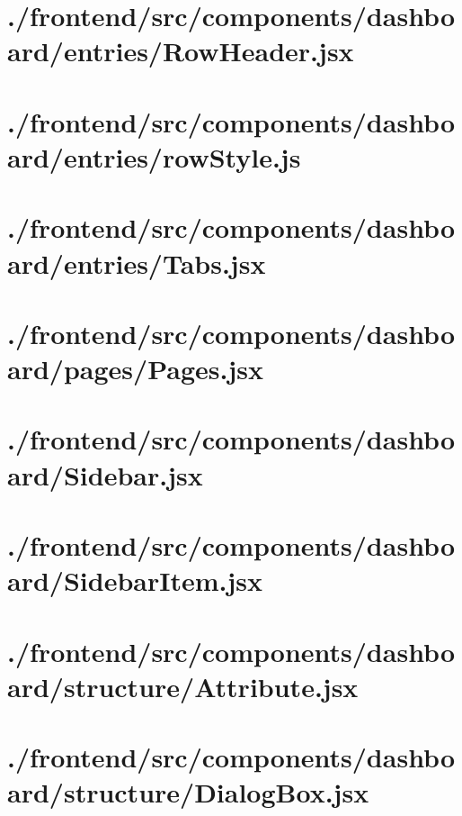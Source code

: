 \documentclass[11pt]{informatics-report}
\begin{document}
\newpage
\section{./frontend/src/components/dashboard/entries/RowHeader.jsx}


\newpage
\section{./frontend/src/components/dashboard/entries/rowStyle.js}


\newpage
\section{./frontend/src/components/dashboard/entries/Tabs.jsx}


\newpage
\section{./frontend/src/components/dashboard/pages/Pages.jsx}


\newpage
\section{./frontend/src/components/dashboard/Sidebar.jsx}


\newpage
\section{./frontend/src/components/dashboard/SidebarItem.jsx}


\newpage
\section{./frontend/src/components/dashboard/structure/Attribute.jsx}


\newpage
\section{./frontend/src/components/dashboard/structure/DialogBox.jsx}

\end{document}
